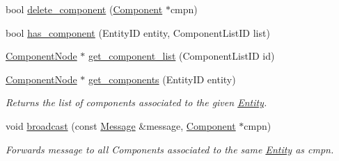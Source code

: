 \begin{DoxyCompactItemize}
bool \hyperlink{classnta_1_1ECS_ab24523ec53373bc159f67ee20d269975}{delete\+\_\+component} (\hyperlink{classnta_1_1Component}{Component} $\ast$cmpn)
\item 
bool \hyperlink{classnta_1_1ECS_acc0017328e58c4046747abf984ef1df1}{has\+\_\+component} (Entity\+ID entity, Component\+List\+ID list)
\item 
\hyperlink{structnta_1_1ComponentNode}{Component\+Node} $\ast$ \hyperlink{classnta_1_1ECS_a901fa4aeec5de189e6bc41635fa843e1}{get\+\_\+component\+\_\+list} (Component\+List\+ID id)
\item 
\mbox{\label{classnta_1_1ECS_afcc00e9823956e58744ad25f2f71fbc7}} 
\hyperlink{structnta_1_1ComponentNode}{Component\+Node} $\ast$ \hyperlink{classnta_1_1ECS_afcc00e9823956e58744ad25f2f71fbc7}{get\+\_\+components} (Entity\+ID entity)
\begin{DoxyCompactList}\small\item\em Returns the list of components associated to the given \hyperlink{classnta_1_1Entity}{Entity}. \end{DoxyCompactList}\item 
\mbox{\label{classnta_1_1ECS_a997e9fa8509387cdb0f08680b019eb64}} 
void \hyperlink{classnta_1_1ECS_a997e9fa8509387cdb0f08680b019eb64}{broadcast} (const \hyperlink{structnta_1_1Message}{Message} \&message, \hyperlink{classnta_1_1Component}{Component} $\ast$cmpn)
\begin{DoxyCompactList}\small\item\em Forwards message to all Components associated to the same \hyperlink{classnta_1_1Entity}{Entity} as cmpn. \end{DoxyCompactList}\end{DoxyCompactItemize}
